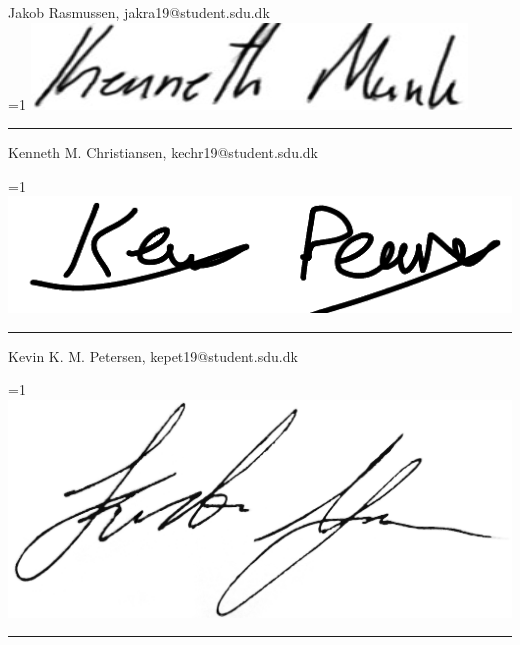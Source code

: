 Jakob Rasmussen, jakra19@student.sdu.dk\\


\ifnum \value{PROD}=1
    \includegraphics[scale=0.3]{images/signatures/signature_kechr19.PNG}
    \vspace{-5mm}
\fi
\par\rule{\textwidth}{0.4pt}

Kenneth M. Christiansen, kechr19@student.sdu.dk\\
\vspace{3.5mm}

\vspace{-6.5mm}

\ifnum \value{PROD}=1
    \includegraphics[scale=0.3]{images/signatures/signature_kepet19.png}
    \vspace{-8mm}
\fi
\par\rule{\textwidth}{0.4pt}

Kevin K. M. Petersen, kepet19@student.sdu.dk


\ifnum \value{PROD}=1
    \includegraphics[scale=0.04]{images/signatures/signature_kjako19.jpg}
    \vspace{-9.5mm}
\fi
\par\rule{\textwidth}{0.4pt}

